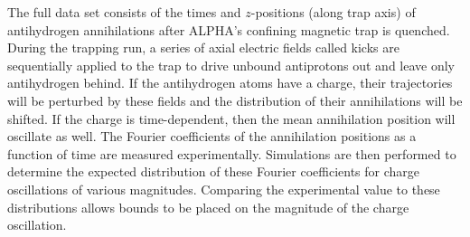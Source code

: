 \documentclass[superscriptaddress,aps,prb,11pt]{revtex4-1}
\begin{document}
The full data set consists of the times and $z$-positions (along trap axis) of antihydrogen annihilations after ALPHA's confining magnetic trap is quenched.  During the trapping run, a series of axial electric fields called kicks are sequentially applied to the trap to drive unbound antiprotons out and leave only antihydrogen behind. If the antihydrogen atoms have a charge, their trajectories will be perturbed by these fields and the distribution of their annihilations will be shifted.  If the charge is time-dependent, then the mean annihilation position will oscillate as well.  The Fourier coefficients of the annihilation positions as a function of time are measured experimentally.  Simulations are then performed to determine the expected distribution of these Fourier coefficients for charge oscillations of various magnitudes.  Comparing the experimental value to these distributions allows bounds to be placed on the magnitude of the charge oscillation.
\end{document}
